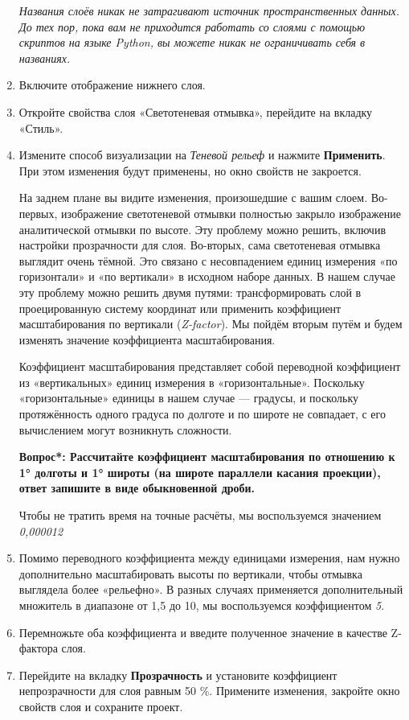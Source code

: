 \documentclass[
  12pt,
]{book}
\begin{document}
\begin{enumerate}
  \emph{Названия слоёв никак не затрагивают источник пространственных данных. До тех пор, пока вам не приходится работать со слоями с помощью скриптов на языке Python, вы можете никак не ограничивать себя в названиях.}
\item
  Включите отображение нижнего слоя.
\item
  Откройте свойства слоя «Светотеневая отмывка», перейдите на вкладку «Стиль».
\item
  Измените способ визуализации на \emph{Теневой рельеф} и нажмите \textbf{Применить}. При этом изменения будут применены, но окно свойств не закроется.

  На заднем плане вы видите изменения, произошедшие с вашим слоем. Во-первых, изображение светотеневой отмывки полностью закрыло изображение аналитической отмывки по высоте. Эту проблему можно решить, включив настройки прозрачности для слоя. Во-вторых, сама светотеневая отмывка выглядит очень тёмной. Это связано с несовпадением единиц измерения «по горизонтали» и «по вертикали» в исходном наборе данных. В нашем случае эту проблему можно решить двумя путями: трансформировать слой в проецированную систему координат или применить коэффициент масштабирования по вертикали (\emph{Z-factor}). Мы пойдём вторым путём и будем изменять значение коэффициента масштабирования.

  Коэффициент масштабирования представляет собой переводной коэффициент из «вертикальных» единиц измерения в «горизонтальные». Поскольку «горизонтальные» единицы в нашем случае --- градусы, и поскольку протяжённость одного градуса по долготе и по широте не совпадает, с его вычислением могут возникнуть сложности.

  \textbf{Вопрос*: Рассчитайте коэффициент масштабирования по отношению к 1° долготы и 1° широты (на широте параллели касания проекции), ответ запишите в виде обыкновенной дроби.}

  Чтобы не тратить время на точные расчёты, мы воспользуемся значением \emph{0,000012}
\item
  Помимо переводного коэффициента между единицами измерения, нам нужно дополнительно масштабировать высоты по вертикали, чтобы отмывка выглядела более «рельефно». В разных случаях применяется дополнительный множитель в диапазоне от 1,5 до 10, мы воспользуемся коэффициентом \emph{5}.
\item
  Перемножьте оба коэффициента и введите полученное значение в качестве Z-фактора слоя.
\item
  Перейдите на вкладку \textbf{Прозрачность} и установите коэффициент непрозрачности для слоя равным 50 \%. Примените изменения, закройте окно свойств слоя и сохраните проект.
\end{enumerate}
\end{document}
